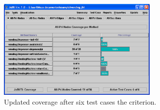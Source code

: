 \begin{figure}[!ht]
\begin{center}
\includegraphics[width=0.70\textwidth]{fig/report-by-method-pri-nodes-tc6}
\caption{\label{fig:summary-method-tc6} Updated coverage after six
test cases \wrt the  criterion.}
\end{center}
\end{figure}
